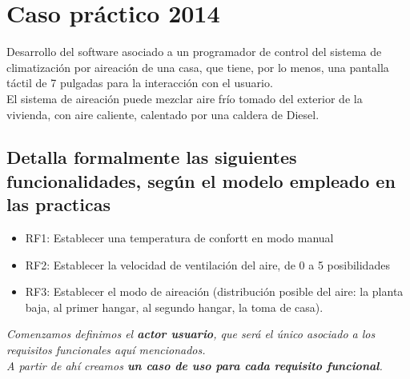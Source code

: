 \section{Caso práctico 2014}
Desarrollo del software asociado a un programador de control del sistema de climatización por aireación de una casa, que tiene, por lo menos, una pantalla táctil de 7 pulgadas para la interacción con el usuario.\\
El sistema de aireación puede mezclar aire frío tomado del exterior de la vivienda, con aire caliente, calentado por una caldera de Diesel.

\subsection{Detalla formalmente las siguientes funcionalidades, según el modelo empleado en las practicas}
\begin{itemize}
    \item RF1: Establecer una temperatura de confortt en modo manual
    \item RF2: Establecer la velocidad de ventilación del aire, de 0 a 5 posibilidades
    \item RF3: Establecer el modo de aireación (distribución posible del aire: la planta baja, al primer hangar, al segundo hangar, la toma de casa).
\end{itemize}
\textit{Comenzamos definimos el \textbf{actor usuario}, que será el único asociado a los requisitos funcionales aquí mencionados.\\
    A partir de ahí creamos \textbf{un caso de uso para cada requisito funcional}.\\}


